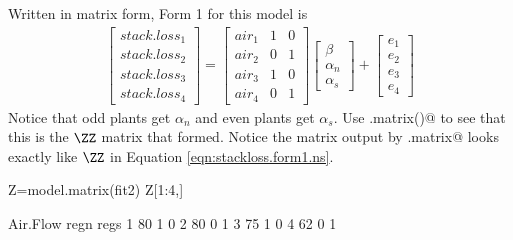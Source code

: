 Written in matrix form, Form 1 for this model is
\begin{equation}\label{eqn:stackloss.form1.ns}
\begin{gathered}
\begin{bmatrix}stack.loss_1\\ stack.loss_2\\ stack.loss_3\\ stack.loss_4\end{bmatrix}
= 
\begin{bmatrix}air_1&1&0\\ air_2&0&1 \\air_3&1&0\\air_4&0&1\end{bmatrix}
\begin{bmatrix}\beta \\ \alpha_n \\ \alpha_s \end{bmatrix}
+
\begin{bmatrix}e_1\\e_2\\e_3\\e_4\end{bmatrix}
\end{gathered}
\end{equation}
Notice that odd plants get $\alpha_n$ and even plants get $\alpha_s$.  Use \verb@model.matrix()@ to see that this is the $\ZZ$ matrix that \verb@lm@ formed. Notice the matrix output by \verb@model.matrix@ looks exactly like $\ZZ$ in Equation \ref{eqn:stackloss.form1.ns}.
\begin{Schunk}
\begin{Sinput}
 Z=model.matrix(fit2)
 Z[1:4,]
\end{Sinput}
\begin{Soutput}
  Air.Flow regn regs
1       80    1    0
2       80    0    1
3       75    1    0
4       62    0    1
\end{Soutput}
\end{Schunk}

